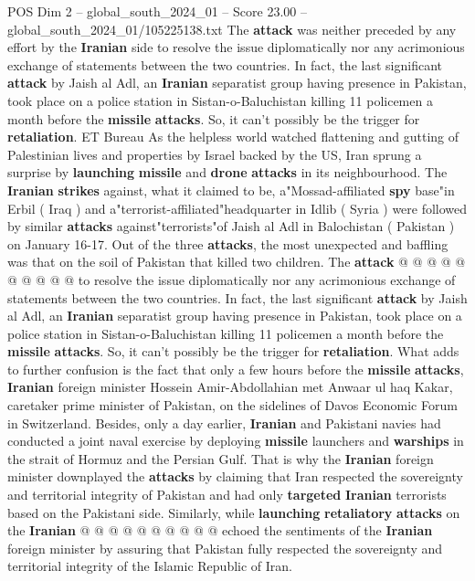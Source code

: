 \begin{textsample}{POS Dim 2 – global\_south\_2024\_01 – Score 23.00 – global\_south\_2024\_01/105225138.txt}  \label{ex:f2_pos_098}
The \textbf{attack} was neither preceded by any effort by the \textbf{Iranian} side to resolve the issue diplomatically nor any acrimonious exchange of statements between the two countries.
In fact, the last significant \textbf{attack} by Jaish al Adl, an \textbf{Iranian} separatist group having presence in Pakistan, took place on a police station in Sistan-o-Baluchistan killing 11 policemen a month before the \textbf{missile} \textbf{attacks}.
So, it can't possibly be the trigger for \textbf{retaliation}.
ET Bureau As the helpless world watched flattening and gutting of Palestinian lives and properties by Israel backed by the US, Iran sprung a surprise by \textbf{launching} \textbf{missile} and \textbf{drone} \textbf{attacks} in its neighbourhood.
The \textbf{Iranian} \textbf{strikes} against, what it claimed to be, a"Mossad-affiliated \textbf{spy} base"in Erbil ( Iraq ) and a"terrorist-affiliated"headquarter in Idlib ( Syria ) were followed by similar \textbf{attacks} against"terrorists"of Jaish al Adl in Balochistan ( Pakistan ) on January 16-17.
Out of the three \textbf{attacks}, the most unexpected and baffling was that on the soil of Pakistan that killed two children.
The \textbf{attack} @ @ @ @ @ @ @ @ @ @ to resolve the issue diplomatically nor any acrimonious exchange of statements between the two countries.
In fact, the last significant \textbf{attack} by Jaish al Adl, an \textbf{Iranian} separatist group having presence in Pakistan, took place on a police station in Sistan-o-Baluchistan killing 11 policemen a month before the \textbf{missile} \textbf{attacks}.
So, it can't possibly be the trigger for \textbf{retaliation}.
What adds to further confusion is the fact that only a few hours before the \textbf{missile} \textbf{attacks}, \textbf{Iranian} foreign minister Hossein Amir-Abdollahian met Anwaar ul haq Kakar, caretaker prime minister of Pakistan, on the sidelines of Davos Economic Forum in Switzerland.
Besides, only a day earlier, \textbf{Iranian} and Pakistani navies had conducted a joint naval exercise by deploying \textbf{missile} launchers and \textbf{warships} in the strait of Hormuz and the Persian Gulf.
That is why the \textbf{Iranian} foreign minister downplayed the \textbf{attacks} by claiming that Iran respected the sovereignty and territorial integrity of Pakistan and had only \textbf{targeted} \textbf{Iranian} terrorists based on the Pakistani side.
Similarly, while \textbf{launching} \textbf{retaliatory} \textbf{attacks} on the \textbf{Iranian} @ @ @ @ @ @ @ @ @ @ echoed the sentiments of the \textbf{Iranian} foreign minister by assuring that Pakistan fully respected the sovereignty and territorial integrity of the Islamic Republic of Iran.

\end{textsample}
